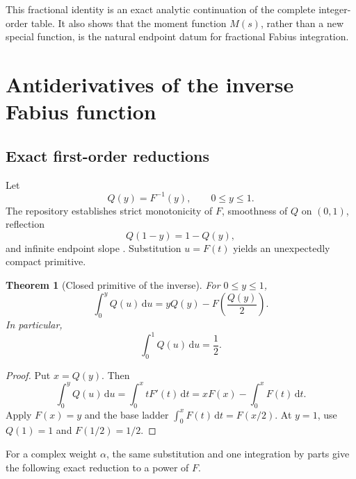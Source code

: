 \documentclass[11pt,oneside]{article}
\newtheorem{theorem}{Theorem}[section]
\theoremstyle{definition}
\theoremstyle{remark}
\newcommand{\dd}{\,\mathrm d}
\newcommand{\1}{\mathbf 1}
\begin{document}
This fractional identity is an exact analytic continuation of the complete
integer-order table.  It also shows that the moment function \(M(s)\), rather
than a new special function, is the natural endpoint datum for fractional
Fabius integration.

\section{Antiderivatives of the inverse Fabius function}

\subsection{Exact first-order reductions}
Let
\begin{equation}
 Q(y)=F^{-1}(y),\qquad 0\leq y\leq1.                            \label{p1:eq:Q-def}
\end{equation}
The repository establishes strict monotonicity of \(F\), smoothness of \(Q\)
on \((0,1)\), reflection
\begin{equation}
 Q(1-y)=1-Q(y),                                                \label{p1:eq:Q-reflect}
\end{equation}
and infinite endpoint slope
\cite{p1:ProveItPrimary,p1:ProveItFrontiers}.  Substitution \(u=F(t)\) yields an
unexpectedly compact primitive.

\begin{theorem}[Closed primitive of the inverse]\label{p1:thm:inverse-first}
For \(0\leq y\leq1\),
\begin{equation}
 \boxed{\quad
 \int_0^yQ(u)\dd u
 =yQ(y)-F\!\left(\frac{Q(y)}2\right).
 \quad}                                                        \label{p1:eq:inverse-first}
\end{equation}
In particular,
\begin{equation}
 \int_0^1Q(u)\dd u=\frac12.                                   \label{p1:eq:inverse-mean}
\end{equation}
\end{theorem}

\begin{proof}
Put \(x=Q(y)\).  Then
\[
 \int_0^yQ(u)\dd u=\int_0^xtF'(t)\dd t
 =xF(x)-\int_0^xF(t)\dd t.
\]
Apply \(F(x)=y\) and the base ladder
\(\int_0^xF(t)\dd t=F(x/2)\).  At \(y=1\), use
\(Q(1)=1\) and \(F(1/2)=1/2\).
\end{proof}

For a complex weight \(\alpha\), the same substitution and one integration by
parts give the following exact reduction to a power of \(F\).
\end{document}
